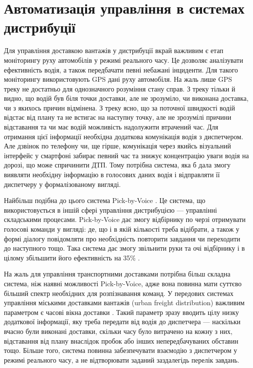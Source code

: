 \section{Автоматизація управління в системах дистрибуції} \label{sect1_3}

Для управління доставкою вантажів у дистрибуції вкрай важливим є етап моніторингу руху автомобілів у режимі реального часу. Це дозволяє аналізувати ефективність водія, а також передбачати певні небажані інциденти. Для такого моніторингу використовують GPS дані руху автомобіля\cite{Gonzalez_2013,Comendador_2012}. На жаль лише GPS треку не достатньо для однозначного розуміння стану справ. З треку тільки й видно, що водій був біля точки доставки, але не зрозуміло, чи виконана доставка, чи з якихось причин відмінена. З треку ясно, що за поточної швидкості водій відстає від плану та не встигає на наступну точку, але не зрозумілі причини відставання та чи має водій можливість надолужити втрачений час. Для отримання цієї інформації необхідна додаткова комунікація водія з диспетчером. Але дзвінок по телефону чи, ще гірше, комунікація через якийсь візуальний інтерфейс у смартфоні забирає певний час та знижує концентрацію уваги водія на дорозі, що може спричинити ДТП. Тому потрібна система, яка б дала змогу виявляти необхідну інформацію в голосових даних водія і відправляти її диспетчеру у формалізованому вигляді.

Найбільш подібна до цього система Pick-by-Voice \cite{Pick-to-Voice}. Це система, що використовується в іншій сфері управління дистрибуцією — управлінні складськими процесами. Pick-by-Voice дає змогу відбірнику по черзі отримувати голосові команди у вигляді: де, що і в якій кількості треба відібрати, а також у формі діалогу повідомляти про необхідність повторити завдання чи переходити до наступного тощо. Така система дає змогу звільнити руки та очі відбірнику і в цілому збільшити його ефективність на 35\% \cite{Baumann_2012}.

На жаль для управління транспортними доставками потрібна більш складна система, ніж наявні можливості Pick-by-Voice, адже вона повинна мати суттєво більший спектр необхідних для розпізнавання команд. У передових системах управління міськими доставками вантажів (urban freight distribution) важливим параметром є часові вікна доставки \cite{Quak_2006}. Такий параметр зразу вводить цілу низку додаткової інформації, яку треба передати від водія до диспетчера — наскільки вчасно були виконані доставки, скільки часу було витрачено на кожну з них, відставання від плану внаслідок пробок або інших непередбачуваних обставин тощо. Більше того, система повинна забезпечувати взаємодію з диспетчером у режимі реального часу, а не відтворювати заданий заздалегідь перелік завдань.

